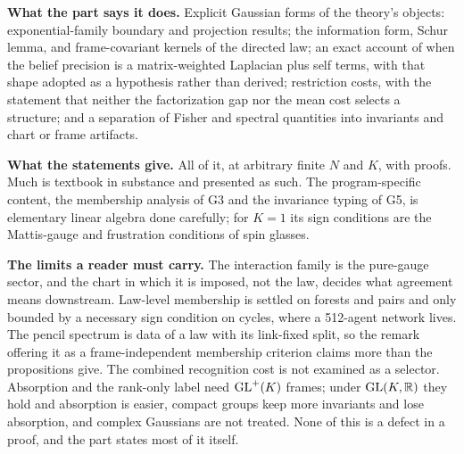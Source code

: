 \begin{verdictbox}{\DELIVERED}
\textbf{What the part says it does.} Explicit Gaussian forms of the theory's objects: exponential-family
boundary and projection results; the information form, Schur lemma, and frame-covariant kernels of the
directed law; an exact account of when the belief precision is a matrix-weighted Laplacian plus self
terms, with that shape adopted as a hypothesis rather than derived; restriction costs, with the
statement that neither the factorization gap nor the mean cost selects a structure; and a separation of Fisher and spectral quantities into invariants and chart or
frame artifacts.

\textbf{What the statements give.} All of it, at arbitrary finite \(N\) and \(K\), with proofs. Much is
textbook in substance and presented as such. The program-specific content, the membership analysis of G3
and the invariance typing of G5, is elementary linear algebra done carefully; for \(K=1\) its sign
conditions are the Mattis-gauge and frustration conditions of spin glasses.

\textbf{The limits a reader must carry.} The interaction family is the pure-gauge sector, and the chart
in which it is imposed, not the law, decides what agreement means downstream. Law-level membership is settled on forests and pairs
and only bounded by a necessary sign condition on cycles, where a 512-agent network lives. The pencil
spectrum is data of a law with its link-fixed split, so the remark offering it as a frame-independent
membership criterion claims more than the propositions give. The combined recognition cost is not
examined as a selector. Absorption and the rank-only label need \(\mathrm{GL}^+(K)\) frames; under \(\mathrm{GL}(K,\mathbb R)\)
they hold and absorption is easier, compact groups keep more invariants and lose absorption, and complex
Gaussians are not treated. None of this is a defect in a proof, and the part states most of it itself.
\end{verdictbox}
